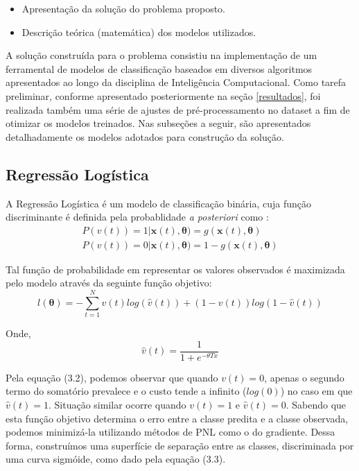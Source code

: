 \documentclass{homework}
\begin{document}
\begin{itemize}
    \color{red}
        \item Apresentação da solução do problema proposto.
        \item Descrição teórica (matemática) dos modelos utilizados.
\end{itemize}

A solução construída para o problema consistiu na implementação de um ferramental de modelos de classificação baseados
em diversos algoritmos apresentados ao longo da disciplina de Inteligência Computacional. Como tarefa preliminar,
conforme apresentado posteriormente na seção \ref{resultados}, foi realizada também uma série de ajustes de
pré-processamento no dataset a fim de otimizar os modelos treinados. Nas subseções a seguir, são apresentados
detalhadamente os modelos adotados para construção da solução.

\subsection{Regressão Logística}

A Regressão Logística é um modelo de classificação binária, cuja função discriminante é definida pela probablidade
\textit{a posteriori} como \cite{evsukoff}:
\begin{equation}
    \begin{split}
        P(v(t)) = 1|\mathbf{x}(t),\mathbf{\theta}) = g(\mathbf{x}(t),\mathbf{\theta}) \\
        P(v(t)) = 0|\mathbf{x}(t),\mathbf{\theta}) = 1 - g(\mathbf{x}(t),\mathbf{\theta})
    \end{split}
\end{equation}

Tal função de probabilidade em representar os valores observados é maximizada pelo modelo através da seguinte função
objetivo:
\begin{equation}
    l(\mathbf{\theta}) = - \sum_{t=1}^{N}v(t)log(\hat{v}(t)) + (1-v(t))log(1-\hat{v}(t))
\end{equation}

Onde,
\begin{equation}
    \hat{v}(t) = \frac{1}{1+e^{-\theta T x}}
\end{equation}

Pela equação (3.2), podemos observar que quando $v(t) = 0$, apenas o segundo termo do somatório prevalece e o custo
tende a infinito ($log(0)$) no caso em que $\hat{v}(t) = 1$. Situação similar ocorre quando $v(t) = 1$ e $\hat{v}(t)=0$.
Sabendo que esta função objetivo determina o erro entre a classe predita e a classe observada, podemos minimizá-la
utilizando métodos de PNL como o do gradiente. Dessa forma, construímos uma superfície de separação entre as classes,
discriminada por uma curva sigmóide, como dado pela equação (3.3).
\end{document}

